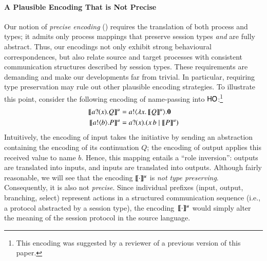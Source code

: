 \documentclass[preprint,11pt]{elsarticle}
\begin{document}
{\paragraph{A Plausible Encoding That is Not Precise}
Our notion of \emph{precise encoding} () 
requires the translation of both process and types; it  
admits only process mappings that preserve session types
\emph{and} are fully abstract. Thus, our encodings 
not only exhibit  strong behavioural correspondences, but also 
 relate source and target processes with consistent 
communication structures described by session types.
These requirements are demanding and make our developments far from trivial.
In particular, requiring type preservation may rule out other plausible encoding strategies.
To illustrate this point,
consider the  following  encoding of %
name-passing 
into $\mathsf{HO}$:\footnote{This encoding was suggested by a reviewer of a previous version of this paper.} %
\begin{align*}
   \llbracket a ? (x) . Q\rrbracket^u & = a ! \langle \lambda x.\,\llbracket Q\rrbracket^u \rangle . \mathbf{0} \\
     \llbracket a ! \langle b \rangle . P\rrbracket^u 	&= a ? (x) .( x\, {b} \;|\; \llbracket P\rrbracket^u)
\end{align*}
{Intuitively, 
the encoding of input takes the initiative by sending an abstraction containing the encoding of its continuation $Q$;
the encoding of output applies this received value to name $b$.}
Hence, this mapping entails  a 
``role inversion'': outputs are translated into inputs, and inputs are translated into outputs. 
Although fairly reasonable, we will see that the encoding $\llbracket\cdot\rrbracket^u$  
is \emph{not type preserving}. Consequently, it is also not \emph{precise}.
Since individual prefixes (input, output, branching, select) 
represent actions in a structured communication sequence (i.e., a protocol abstracted by a session type),
the encoding~$\llbracket\cdot\rrbracket^u$ would simply alter the meaning of the session protocol in the source language.


}
\end{document}
